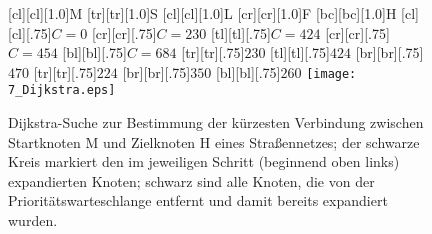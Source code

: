 \begin{figure}[ht]
\newcommand{\smallsize}{.75}
	[cl][cl][1.0]{M}
	[tr][tr][1.0]{S}
	[cl][cl][1.0]{L}
	[cr][cr][1.0]{F}
	[bc][bc][1.0]{H}
	[cl][cl][\smallsize]{$C\!=\!0$}
	[cr][cr][\smallsize]{$C\!=\!230$}
	[tl][tl][\smallsize]{$C\!=\!424$}
	[cr][cr][\smallsize]{$C\!=\!454$}
  [bl][bl][\smallsize]{$C\!=\!684$}
  [tr][tr][\smallsize]{$230$}
	[tl][tl][\smallsize]{$424$}
  [br][br][\smallsize]{$470$}
  [tr][tr][\smallsize]{$224$}
  [br][br][\smallsize]{$350$}
  [bl][bl][\smallsize]{$260$}
 \texttt{[image: 7\_Dijkstra.eps]}
	\caption[Dijkstra-Suche zur Bestimmung des kürzesten Wegs]{Dijkstra-Suche zur Bestimmung der kürzesten Verbindung zwischen Startknoten M und Zielknoten H eines Straßennetzes; der schwarze Kreis markiert den im jeweiligen Schritt (beginnend oben links) expandierten Knoten; schwarz sind alle Knoten, die von der Prioritätswarteschlange entfernt und damit bereits expandiert wurden.} 
	\label{fig:dijkstra}
\end{figure}

